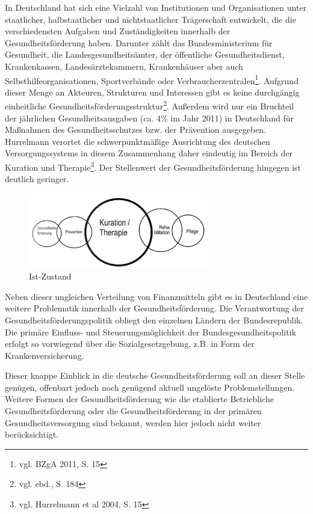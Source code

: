 In Deutschland hat sich eine Vielzahl von Institutionen und Organisationen unter staatlicher, halbstaatlicher und nichtstaatlicher Trägerschaft entwickelt, die die verschiedensten Aufgaben und Zuständigkeiten innerhalb der Gesundheitsförderung haben. Darunter zählt das Bundesministerium für Gesundheit, die Landesgesundheitsämter, der öffentliche Gesundheitsdienst, Krankenkassen, Landesärztekammern, Krankenhäuser aber auch Selbsthilfeorganisationen, Sportverbände oder Verbraucherzentralen\footnote{vgl. BZgA 2011, S. 15}. Aufgrund dieser Menge an Akteuren, Strukturen und Interessen gibt es keine durchgängig einheitliche Gesundheitsförderungsstruktur\footnote{vgl. ebd., S. 184}. Außerdem wird nur ein Bruchteil der jährlichen Gesundheitsausgaben (ca. 4\% im Jahr 2011) in Deutschland für Maßnahmen des Gesundheitsschutzes bzw. der Prävention ausgegeben. Hurrelmann verortet die schwerpunktmäßige Ausrichtung des deutschen Versorgungssystems in diesem Zusammenhang daher eindeutig im Bereich der Kuration und Therapie\footnote{vgl. Hurrelmann et al 2004, S. 15}. Der Stellenwert der Gesundheitsförderung hingegen ist deutlich geringer.

\begin{figure}[h]
	\centering
		\includegraphics[width=0.70\textwidth]{ist-soll2.png}
	\caption{Ist-Zustand}
	\label{fig:ist-soll2}
\end{figure}

Neben dieser ungleichen Verteilung von Finanzmitteln gibt es in Deutschland eine weitere Problematik innerhalb der Gesundheitsförderung. Die Verantwortung der Gesundheitsförderungspolitik obliegt den einzelnen Ländern der Bundesrepublik. Die primäre Einfluss- und Steuerungsmöglichkeit der Bundesgesundheitspolitik erfolgt so vorwiegend über die Sozialgesetzgebung, z.B. in Form der Krankenversicherung.

Dieser knappe Einblick in die deutsche Gesundheitsförderung soll an dieser Stelle genügen, offenbart jedoch noch genügend aktuell ungelöste Problemstellungen. Weitere Formen der Gesundheitsförderung wie die etablierte Betriebliche Gesundheitsförderung oder die Gesundheitsförderung in der primären Gesundheitsversorgung sind bekannt, werden hier jedoch nicht weiter berücksichtigt.


